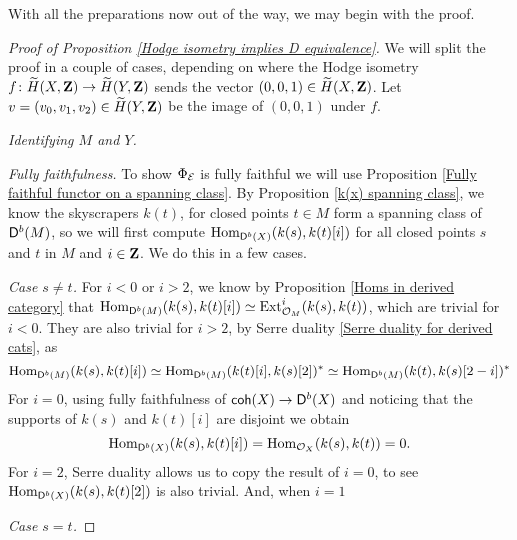 \noindent
With all the preparations now out of the way, we may begin with the proof.
\begin{proof}[Proof of Proposition \ref{Hodge isometry implies D equivalence}]

    We will split the proof in a couple of cases, depending on where the Hodge isometry $f \colon \widetilde{H}(X, \mathbf Z) \to \widetilde{H}(Y, \mathbf Z)$ sends the vector $(0,0,1) \in \widetilde{H}(X, \mathbf Z)$. Let $v = (v_0, v_1, v_2) \in \widetilde{H}(Y, \mathbf Z)$ be the image of $(0,0,1)$ under $f$.



    \vspace{0.5 cm}
    \noindent
    \textsl{Identifying $M$ and $Y$.}

    \vspace{0.5 cm}
    \noindent
    \textsl{Fully faithfulness.} To show $\Phi_{\mathcal E}$ is fully faithful we will use Proposition \ref{Fully faithful functor on a spanning class}. By Proposition \ref{k(x) spanning class}, we know the skyscrapers $k(t)$, for closed points $t \in M$ form a spanning class of $\mathsf{D}^b(M)$, so we will first compute $\operatorname{Hom}_{\mathsf{D}^b(X)}(k(s), k(t)[i])$ for all closed points $s$ and $t$ in $M$ and $i \in \mathbf Z$. We do this in a few cases.

    \vspace{0.3cm}
    \noindent
    \textsl{Case $s \neq t$.} For $i < 0$ or $i > 2$, we know by Proposition \ref{Homs in derived category} that $\operatorname{Hom}_{\mathsf{D}^b(M)}(k(s), k(t)[i]) \simeq \operatorname{Ext}^i_{{\mathcal{O}_{M}}}(k(s), k(t))$, which are trivial for $i < 0$. They are also trivial for $i > 2$, by Serre duality \ref{Serre duality for derived cats}, as
    \[
        \operatorname{Hom}_{\mathsf{D}^b(M)}(k(s), k(t)[i]) \simeq \operatorname{Hom}_{\mathsf{D}^b(M)}(k(t)[i], k(s)[2])^* \simeq \operatorname{Hom}_{\mathsf{D}^b(M)}(k(t), k(s)[2 - i])^*
    \]   
    For $i = 0$, using fully faithfulness of $\mathsf{coh}(X) \to \mathsf{D}^b(X)$ and noticing that the supports of $k(s)$ and $k(t)[i]$ are disjoint we obtain 
    \[
    \operatorname{Hom}_{\mathsf{D}^b(X)}(k(s), k(t)[i]) = \operatorname{Hom}_{{\mathcal{O}_{X}}}(k(s), k(t)) = 0.
    \]
    For $i = 2$, Serre duality allows us to copy the result of $i = 0$, to see $\operatorname{Hom}_{\mathsf{D}^b(X)}(k(s), k(t)[2])$ is also trivial.
    And, when $i = 1$ 

    \vspace{0.3cm}
    \noindent
    \textsl{Case $s = t$.}



\end{proof}

